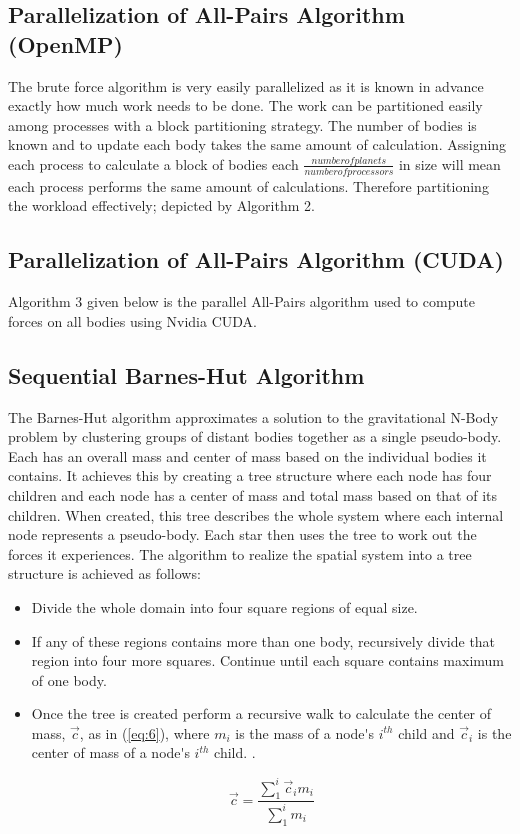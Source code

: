 \documentclass[letterpaper, 10 pt, conference]{ieeeconf}
\begin{document}
\subsection{Parallelization of All-Pairs Algorithm (OpenMP)}

The brute force algorithm is very easily parallelized as it is known in advance exactly how much work needs to be done. The work can be partitioned easily among processes with a block partitioning strategy. The number of bodies is known and to update each body takes the same amount of calculation. Assigning each process to calculate a block of bodies each $\frac{number of planets}{number of processors}$ in size will mean each process performs the same amount of calculations. Therefore partitioning the workload effectively; depicted by Algorithm 2.



\subsection{Parallelization of All-Pairs Algorithm (CUDA)}

Algorithm 3 given below is the parallel All-Pairs algorithm used to compute forces on all bodies using Nvidia CUDA.


\subsection{Sequential Barnes-Hut Algorithm}

The Barnes-Hut algorithm \cite{c8} approximates a solution to the gravitational N-Body problem by clustering groups of distant bodies together as a single pseudo-body. Each has an overall mass and center of mass based on the individual bodies it contains. It achieves this by creating a tree structure where each node has four children and each node has a center of mass and total mass based on that of its children. When created, this tree describes the whole system where each internal node represents a pseudo-body. Each star then uses the tree to work out the forces it experiences. The algorithm to realize the spatial system into a tree structure is achieved as follows:

\begin{itemize}
\item Divide the whole domain into four square regions of equal size.
\item If any of these regions contains more than one body, recursively divide that region into four more squares. Continue until each square contains maximum of one body.
\item Once the tree is created perform a recursive walk to calculate the center of mass, $\vec{c}$, as in (\ref{eq:6}), where $m_i$ is the mass of a node\'{}s $i^{th}$ child and $\vec{c}_i$ is the center of mass of a node\'{}s $i^{th}$ child.
.

\begin{equation} \label{eq:6}
\vec{c} = \frac{\sum_{1}^i\vec{c}_im_i}{\sum_{1}^im_i}
\end{equation}
\end{itemize}
\end{document}
